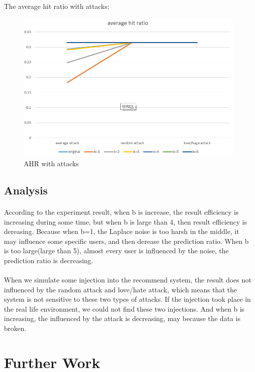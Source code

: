 \documentclass[a4paper, 12pt]{article}
\theoremstyle{definition}
\begin{document}
The average hit ratio with attacks:
\begin{figure}[H]
	\centering
	\includegraphics[scale = 0.4]{hit-ratio-attack.png}
	\caption{AHR with attacks}
\end{figure}
\subsection{Analysis}
\paragraph{}According to the experiment result, when b is increase, the result efficiency is increasing during some time, but when b is large than 4, then result efficiency is dereasing. Because when b=1, the Laplace noise is too harsh in the middle, it may influence some specific users, and then derease the prediction ratio. When b is too large(large than 5), almost every user is influenced by the noise, the prediction ratio is decreasing.
\paragraph{}When we simulate some injection into the recommend system, the result does not influenced by the random attack and love/hate attack, which means that the system is not sensitive to these two types of attacks. If the injection took place in the real life environment, we could not find these two injections. And when b is increasing, the influenced by the attack is decreasing, may because the data is broken.

\section{Further Work}
\end{document}
